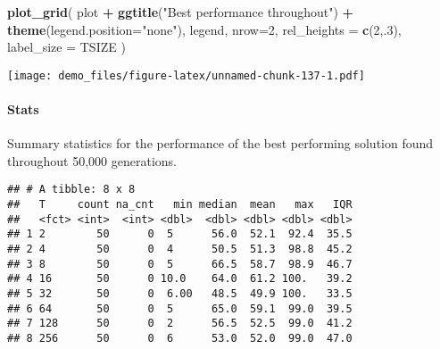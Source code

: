 \documentclass[]{book}
\newenvironment{Shaded}{\begin{snugshade}}{\end{snugshade}}
\newcommand{\DataTypeTok}[1]{\textcolor[rgb]{0.13,0.29,0.53}{#1}}
\newcommand{\DecValTok}[1]{\textcolor[rgb]{0.00,0.00,0.81}{#1}}
\newcommand{\KeywordTok}[1]{\textcolor[rgb]{0.13,0.29,0.53}{\textbf{#1}}}
\newcommand{\NormalTok}[1]{#1}
\newcommand{\OperatorTok}[1]{\textcolor[rgb]{0.81,0.36,0.00}{\textbf{#1}}}
\newcommand{\OtherTok}[1]{\textcolor[rgb]{0.56,0.35,0.01}{#1}}
\newcommand{\StringTok}[1]{\textcolor[rgb]{0.31,0.60,0.02}{#1}}
\let\oldparagraph\paragraph
\renewcommand{\paragraph}[1]{\oldparagraph{#1}\mbox{}}
\begin{document}
\begin{Shaded}
\begin{Highlighting}[]
\KeywordTok{plot_grid}\NormalTok{(}
\NormalTok{  plot }\OperatorTok{+}
\StringTok{    }\KeywordTok{ggtitle}\NormalTok{(}\StringTok{"Best performance throughout"}\NormalTok{) }\OperatorTok{+}
\StringTok{    }\KeywordTok{theme}\NormalTok{(}\DataTypeTok{legend.position=}\StringTok{"none"}\NormalTok{),}
\NormalTok{  legend,}
  \DataTypeTok{nrow=}\DecValTok{2}\NormalTok{,}
  \DataTypeTok{rel_heights =} \KeywordTok{c}\NormalTok{(}\DecValTok{2}\NormalTok{,.}\DecValTok{3}\NormalTok{),}
  \DataTypeTok{label_size =}\NormalTok{ TSIZE}
\NormalTok{)}
\end{Highlighting}
\end{Shaded}

\texttt{[image: demo\_files/figure-latex/unnamed-chunk-137-1.pdf]}

\hypertarget{stats-26}{%
\paragraph{Stats}\label{stats-26}}

Summary statistics for the performance of the best performing solution found throughout 50,000 generations.

\begin{Shaded}
\end{Shaded}

\begin{verbatim}
## # A tibble: 8 x 8
##   T     count na_cnt   min median  mean   max   IQR
##   <fct> <int>  <int> <dbl>  <dbl> <dbl> <dbl> <dbl>
## 1 2        50      0  5      56.0  52.1  92.4  35.5
## 2 4        50      0  4      50.5  51.3  98.8  45.2
## 3 8        50      0  5      66.5  58.7  98.9  46.7
## 4 16       50      0 10.0    64.0  61.2 100.   39.2
## 5 32       50      0  6.00   48.5  49.9 100.   33.5
## 6 64       50      0  5      65.0  59.1  99.0  39.5
## 7 128      50      0  2      56.5  52.5  99.0  41.2
## 8 256      50      0  6      53.0  52.0  99.0  47.0
\end{verbatim}
\end{document}
